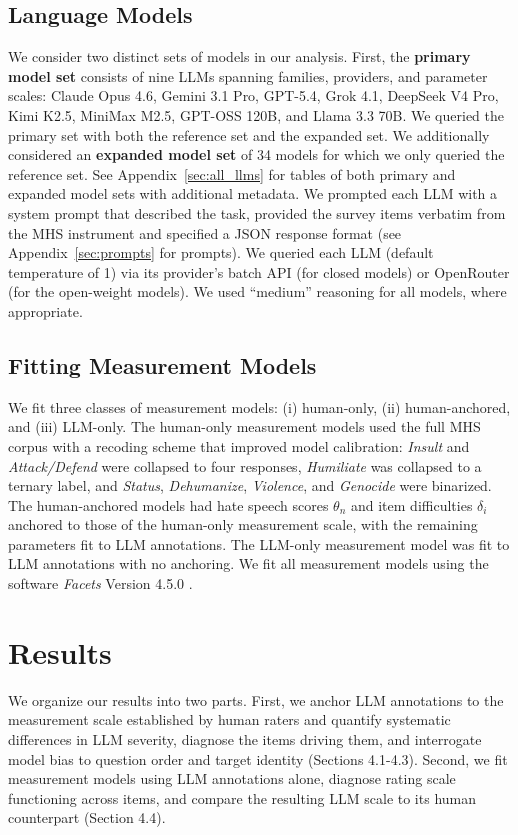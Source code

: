 \documentclass[11pt]{article}
\begin{document}
\subsection{Language Models}
\label{sec:models}
We consider two distinct sets of models in our analysis. First, the \textbf{primary model set} consists of nine LLMs spanning families, providers, and parameter scales: Claude Opus 4.6, Gemini 3.1 Pro, GPT-5.4, Grok 4.1, DeepSeek V4 Pro, Kimi K2.5, MiniMax M2.5, GPT-OSS 120B, and Llama 3.3 70B. We queried the primary set with both the reference set and the expanded set. We additionally considered an \textbf{expanded model set} of 34 models for which we only queried the reference set. See Appendix~\ref{sec:all_llms} for tables of both primary and expanded model sets with additional metadata. We prompted each LLM with a system prompt that described the task, provided the survey items verbatim from the MHS instrument and specified a JSON response format (see Appendix~\ref{sec:prompts} for prompts). We queried each LLM (default temperature of 1) via its provider's batch API (for closed models) or OpenRouter (for the open-weight models). We used ``medium'' reasoning for all models, where appropriate.

\subsection{Fitting Measurement Models}
\label{sec:measurement_fit}
We fit three classes of measurement models: (i) human-only, (ii) human-anchored, and (iii) LLM-only. The human-only measurement models used the full MHS corpus with a recoding scheme that improved model calibration: \textit{Insult} and \textit{Attack/Defend} were collapsed to four responses, \textit{Humiliate} was collapsed to a ternary label, and \textit{Status}, \textit{Dehumanize}, \textit{Violence}, and \textit{Genocide} were binarized. The human-anchored models had hate speech scores $\theta_n$ and item difficulties $\delta_i$ anchored to those of the human-only measurement scale, with the remaining parameters fit to LLM annotations. The LLM-only measurement model was fit to LLM annotations with no anchoring. We fit all measurement models using the software \textit{Facets} Version 4.5.0 \cite{Linacre2026Facets}.

\section{Results}
\label{sec:results}
We organize our results into two parts. First, we anchor LLM annotations to the measurement scale established by human raters and quantify systematic differences in LLM severity, diagnose the items driving them, and interrogate model bias to question order and target identity (Sections 4.1-4.3). Second, we fit measurement models using LLM annotations alone, diagnose rating scale functioning across items, and compare the resulting LLM scale to its human counterpart (Section 4.4).
\end{document}
